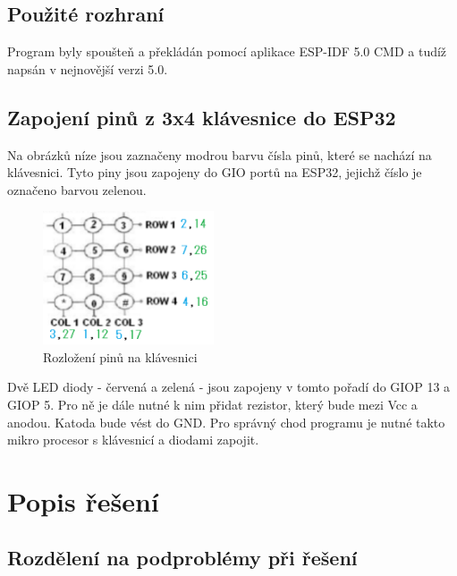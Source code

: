 \documentclass[a4paper, 11pt]{article}
\begin{document}
\subsection{Použité rozhraní}
Program byly spoušteň a překládán pomocí aplikace ESP-IDF 5.0 CMD a tudíž napsán v nejnovější verzi 5.0.

\subsection{Zapojení pinů z 3x4 klávesnice do ESP32}
Na obrázků níze jsou zaznačeny modrou barvu čísla pinů, které se nachází na klávesnici. Tyto piny jsou zapojeny do GIO portů na ESP32, jejichž číslo je označeno barvou zelenou.

\begin{figure}[h]
    \centering
    \includegraphics[width=0.45\textwidth]{pins.png}
    \caption{Rozložení pinů na klávesnici}
    \label{fig:pins.png}
\end{figure}
 Dvě LED diody - červená a zelená - jsou zapojeny v tomto pořadí do GIOP 13 a GIOP 5. Pro ně je dále nutné k nim přidat rezistor, který bude mezi Vcc a anodou. Katoda bude vést do GND.
Pro správný chod programu je nutné takto mikro procesor s klávesnicí a diodami zapojit.

\newpage

\section{Popis řešení}
\subsection{Rozdělení na podproblémy při řešení}
\end{document}
